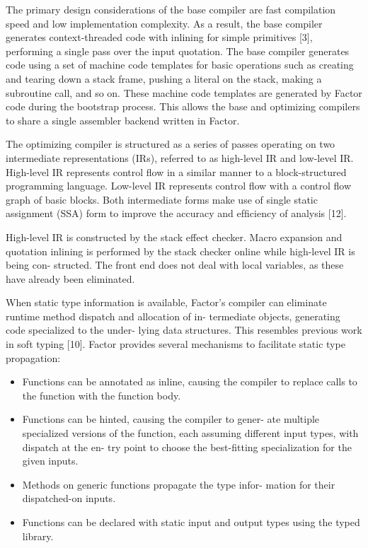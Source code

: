 The primary design considerations of the base compiler are fast compilation
speed and low implementation complexity.  As a result, the base compiler
generates context-threaded code with inlining for simple primitives [3],
performing a single pass over the input quotation.  The base compiler generates
code using a set of machine code templates for basic operations such as
creating and tearing down a stack frame, pushing a literal on the stack, making
a subroutine call, and so on. These machine code templates are generated by
Factor code during the bootstrap process. This allows the base and optimizing
compilers to share a single assembler backend written in Factor.


The optimizing compiler is structured as a series of passes operating on two
intermediate representations (IRs), referred to as high-level IR and low-level
IR. High-level IR represents control ﬂow in a similar manner to a
block-structured programming language. Low-level IR represents control ﬂow with a control ﬂow graph of basic
blocks. Both intermediate forms make use of single static assignment (SSA) form
to improve the accuracy and efﬁciency of analysis [12].

High-level IR is constructed by the stack effect checker.  Macro expansion and
quotation inlining is performed by the stack checker online while high-level IR
is being con- structed. The front end does not deal with local variables, as
these have already been eliminated.

When static type information is available, Factor’s compiler can eliminate
runtime method dispatch and allocation of in- termediate objects, generating
code specialized to the under- lying data structures. This resembles previous
work in soft typing [10]. Factor provides several mechanisms to facilitate
static type propagation:

\begin{itemize}

\item Functions can be annotated as inline, causing the compiler to replace
calls to the function with the function body.

\item Functions can be hinted, causing the compiler to gener- ate multiple
specialized versions of the function, each assuming different input types, with
dispatch at the en- try point to choose the best-ﬁtting specialization for the
given inputs.  

\item Methods on generic functions propagate the type infor- mation for their
dispatched-on inputs.  

\item Functions can be declared with static input and output types using the
typed library.

\end{itemize}

